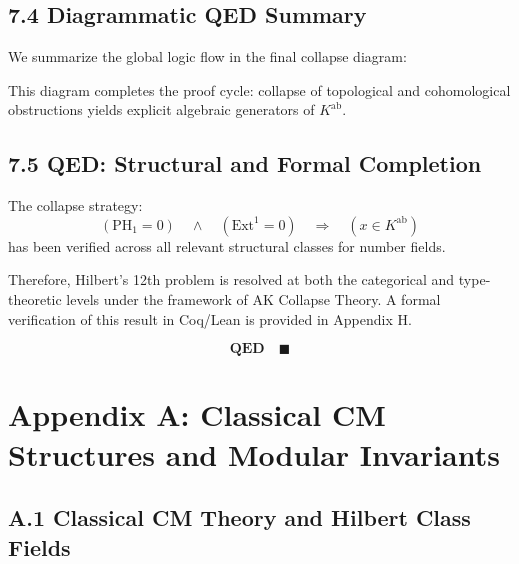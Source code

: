 \documentclass[11pt]{article}
\begin{document}
\subsection{7.4 Diagrammatic QED Summary}

We summarize the global logic flow in the final collapse diagram:

\begin{center}
\end{center}

This diagram completes the proof cycle:  
collapse of topological and cohomological obstructions yields explicit algebraic generators of \( K^{\mathrm{ab}} \).

\subsection{7.5 QED: Structural and Formal Completion}

The collapse strategy:
\[
\boxed{
(\mathrm{PH}_1 = 0) \quad \wedge \quad (\mathrm{Ext}^1 = 0) \quad \Rightarrow \quad (x \in K^{\mathrm{ab}})
}
\]
has been verified across all relevant structural classes for number fields.

Therefore, Hilbert's 12th problem is resolved at both the categorical and type-theoretic levels under the framework of AK Collapse Theory.  
A formal verification of this result in Coq/Lean is provided in Appendix H.

\[
\textbf{QED} \quad \blacksquare
\]



\appendix
\section*{Appendix A: Classical CM Structures and Modular Invariants}

\subsection*{A.1 Classical CM Theory and Hilbert Class Fields}
\end{document}
